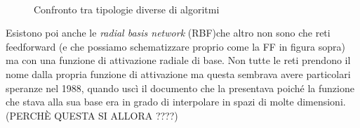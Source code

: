 \begin{figure}[hbtb]
\centering
{} \quad
{} \quad
{}\\
\caption{Confronto tra tipologie diverse di algoritmi}
\label{fig:subfig}
\end{figure}

Esistono poi anche le \textit{radial basis network} (RBF)che altro non sono che reti feedforward (e che possiamo schematizzare proprio come la FF in figura sopra) ma con una funzione di attivazione radiale di base. Non tutte le reti prendono il nome dalla propria funzione di attivazione ma questa sembrava avere particolari speranze nel 1988, quando uscì il documento che la presentava poiché la funzione che stava alla sua base era in grado di interpolare in spazi di molte dimensioni.(PERCHÈ QUESTA SI ALLORA ????) 
\\



